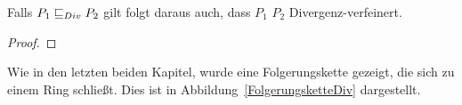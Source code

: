 


\begin{Satz}
  \label{DivTestVerfSatz}
  Falls $P_1  \sqsubseteq  _{Div} P_2$ gilt folgt daraus auch, dass $P_1$ $P_2$
  Divergenz-verfeinert.
\end{Satz}
\begin{proof}
\end{proof}

Wie in den letzten beiden Kapitel, wurde eine Folgerungskette gezeigt, die sich
zu einem Ring schließt. Dies ist in Abbildung~\ref{FolgerungsketteDiv}
dargestellt.


